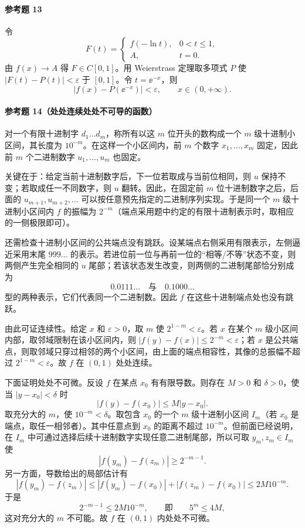 \paragraph{参考题 13}
\begin{xsolution}
令
\[
  F(t)=
  \begin{cases}
    f(-\ln t),&0<t\leqslant1,\\
    A,&t=0.
  \end{cases}
\]
由 $f(x)\to A$ 得 $F\in C[0,1]$。用 Weierstrass 定理取多项式 $P$ 使 $|F(t)-P(t)|<\varepsilon$ 于 $[0,1]$。令 $t=\ee^{-x}$，则
\[
  |f(x)-P(\ee^{-x})|<\varepsilon,
  \qquad x\in(0,+\infty).
\]
\end{xsolution}

\paragraph{参考题 14（处处连续处处不可导的函数）}
\begin{xsolution}
对一个有限十进制字 $d_1\ldots d_m$，称所有以这 $m$ 位开头的数构成一个 $m$ 级十进制小区间，其长度为 $10^{-m}$。在这样一个小区间内，前 $m$ 个数字 $x_1,\ldots,x_m$ 固定，因此前 $m$ 个二进制数字 $u_1,\ldots,u_m$ 也固定。

关键在于：给定当前十进制数字后，下一位若取成与当前位相同，则 $u$ 保持不变；若取成任一不同数字，则 $u$ 翻转。因此，在固定前 $m$ 位十进制数字之后，后面的 $u_{m+1},u_{m+2},\ldots$ 可以按任意预先指定的二进制序列实现。于是同一个 $m$ 级十进制小区间内 $f$ 的振幅为 $2^{-m}$（端点采用题中约定的有限十进制表示时，取相应的一侧极限即可）。

还需检查十进制小区间的公共端点没有跳跃。设某端点右侧采用有限表示，左侧逼近采用末尾 $999\ldots$ 的表示。若进位前一位与再前一位的“相等/不等”状态不变，则两侧产生完全相同的 $u$ 尾部；若该状态发生改变，则两侧的二进制尾部恰分别成为
\[
  0.0111\ldots\quad\text{与}\quad0.1000\ldots
\]
型的两种表示，它们代表同一个二进制数。因此 $f$ 在这些十进制端点处也没有跳跃。

由此可证连续性。给定 $x$ 和 $\varepsilon>0$，取 $m$ 使 $2^{1-m}<\varepsilon$。若 $x$ 在某个 $m$ 级小区间内部，取邻域限制在该小区间内，则 $|f(y)-f(x)|\leqslant2^{-m}<\varepsilon$；若 $x$ 是公共端点，则取邻域只穿过相邻的两个小区间，由上面的端点相容性，其像的总振幅不超过 $2^{1-m}<\varepsilon$。故 $f$ 在 $(0,1)$ 处处连续。

下面证明处处不可微。反设 $f$ 在某点 $x_0$ 有有限导数。则存在 $M>0$ 和 $\delta>0$，使当 $|y-x_0|<\delta$ 时
\[
  |f(y)-f(x_0)|\leqslant M|y-x_0|.
\]
取充分大的 $m$，使 $10^{-m}<\delta$。取包含 $x_0$ 的一个 $m$ 级十进制小区间 $I_m$（若 $x_0$ 是端点，取任一相邻者）。其中任意点到 $x_0$ 的距离不超过 $10^{-m}$。但前面已经说明，在 $I_m$ 中可通过选择后续十进制数字实现任意二进制尾部，所以可取 $y_m,z_m\in I_m$ 使
\[
  |f(y_m)-f(z_m)|\geqslant2^{-m-1}.
\]
另一方面，导数给出的局部估计有
\[
  |f(y_m)-f(z_m)|
  \leqslant|f(y_m)-f(x_0)|+|f(z_m)-f(x_0)|
  \leqslant2M10^{-m}.
\]
于是
\[
  2^{-m-1}\leqslant2M10^{-m},
  \qquad\text{即}\qquad 5^m\leqslant4M,
\]
这对充分大的 $m$ 不可能。故 $f$ 在 $(0,1)$ 内处处不可微。
\end{xsolution}

